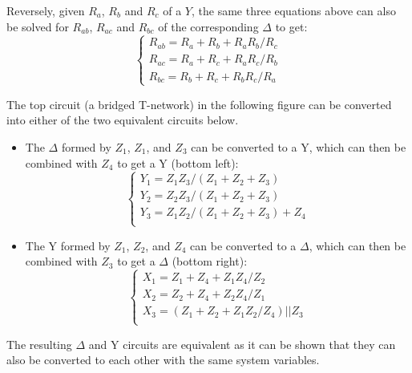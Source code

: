 \documentclass{article}
\begin{document}
\begin{itemize}
\begin{itemize}
    Reversely, given $R_a$, $R_b$ and $R_c$ of a $Y$, the same three 
    equations above can also be solved for $R_{ab}$, $R_{ac}$ and $R_{bc}$ 
    of the corresponding $\Delta$ to get:
    \begin{equation} 
      \left\{ \begin{array}{rr}
        R_{ab}=R_a+R_b+R_aR_b/R_c	\\
        R_{ac}=R_a+R_c+R_aR_c/R_b	\\
        R_{bc}=R_b+R_c+R_bR_c/R_a	\end{array} \right. 
    \end{equation}
\end{itemize}

The top circuit (a bridged T-network) in the following figure can
be converted into either of the two equivalent circuits below.


\begin{itemize}
\item The $\Delta$ formed by $Z_1$, $Z_1$, and $Z_3$ can be converted 
  to a Y, which can then be combined with $Z_4$ to get a Y (bottom left):
  \begin{equation}
    \left\{ \begin{array}{l}
      Y_1=Z_1Z_3/(Z_1+Z_2+Z_3) \\
      Y_2=Z_2Z_3/(Z_1+Z_2+Z_3) \\
      Y_3=Z_1Z_2/(Z_1+Z_2+Z_3)+Z_4 \\
    \end{array} \right. 
  \end{equation}
\item The Y formed by $Z_1$, $Z_2$, and $Z_4$ can be converted to a 
  $\Delta$, which can then be combined with $Z_3$ to get a $\Delta$ 
  (bottom right):
  \begin{equation}
    \left\{ \begin{array}{l}
      X_1=Z_1+Z_4+Z_1Z_4/Z_2 \\
      X_2=Z_2+Z_4+Z_2Z_4/Z_1 \\
      X_3=(Z_1+Z_2+Z_1Z_2/Z_4) || Z_3 \\
    \end{array} \right. 
  \end{equation}
\end{itemize}
The resulting $\Delta$ and Y circuits are equivalent as it can be
shown that they can also be converted to each other with the same 
system variables.
\end{itemize}
\end{document}
